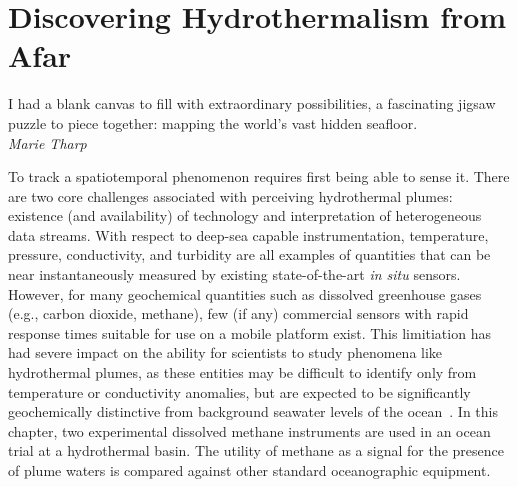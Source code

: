 \chapter{Discovering Hydrothermalism from Afar}
\label{chap:afar}

\begin{center}
    \begin{minipage}{0.7\textwidth}
      \begin{small}
      I had a blank canvas to fill with extraordinary possibilities, a fascinating jigsaw puzzle to piece together: mapping the world's vast hidden seafloor.\\ \emph{Marie Tharp}
      \end{small}
    \end{minipage}
    \vspace{0.5cm}
\end{center}

To track a spatiotemporal phenomenon requires first being able to sense it. There are two core challenges associated with perceiving hydrothermal plumes: existence (and availability) of technology and interpretation of heterogeneous data streams. With respect to deep-sea capable instrumentation, temperature, pressure, conductivity, and turbidity are all examples of quantities that can be near instantaneously measured by existing state-of-the-art \emph{in situ} sensors. However, for many geochemical quantities such as dissolved greenhouse gases (e.g., carbon dioxide, methane), few (if any) commercial sensors with rapid response times suitable for use on a mobile platform exist. This limitiation has had severe impact on the ability for scientists to study phenomena like hydrothermal plumes, as these entities may be difficult to identify only from temperature or conductivity anomalies, but are expected to be significantly geochemically distinctive from background seawater levels of the ocean~\autocite{scholz2019shelf,jakuba2007stochastic}. In this chapter, two experimental dissolved methane instruments are used in an ocean trial at a hydrothermal basin. The utility of methane as a signal for the presence of plume waters is compared against other standard oceanographic equipment.

